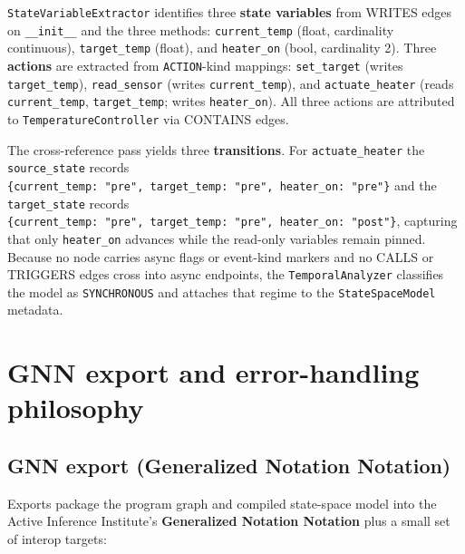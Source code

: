 \documentclass[
]{article}
\begin{document}
\texttt{StateVariableExtractor} identifies three \textbf{state
variables} from WRITES edges on \texttt{\_\_init\_\_} and the three
methods: \texttt{current\_temp} (float, cardinality continuous),
\texttt{target\_temp} (float), and \texttt{heater\_on} (bool,
cardinality 2). Three \textbf{actions} are extracted from
\texttt{ACTION}-kind mappings: \texttt{set\_target} (writes
\texttt{target\_temp}), \texttt{read\_sensor} (writes
\texttt{current\_temp}), and \texttt{actuate\_heater} (reads
\texttt{current\_temp}, \texttt{target\_temp}; writes
\texttt{heater\_on}). All three actions are attributed to
\texttt{TemperatureController} via CONTAINS edges.

The cross-reference pass yields three \textbf{transitions}. For
\texttt{actuate\_heater} the \texttt{source\_state} records
\texttt{\{current\_temp:\ "pre",\ target\_temp:\ "pre",\ heater\_on:\ "pre"\}}
and the \texttt{target\_state} records
\texttt{\{current\_temp:\ "pre",\ target\_temp:\ "pre",\ heater\_on:\ "post"\}},
capturing that only \texttt{heater\_on} advances while the read-only
variables remain pinned. Because no node carries async flags or
event-kind markers and no CALLS or TRIGGERS edges cross into async
endpoints, the \texttt{TemporalAnalyzer} classifies the model as
\texttt{SYNCHRONOUS} and attaches that regime to the
\texttt{StateSpaceModel} metadata.

\newpage

\section{GNN export and error-handling
philosophy}\label{gnn-export-and-error-handling-philosophy}

\subsection{GNN export (Generalized Notation
Notation)}\label{gnn-export-generalized-notation-notation}

Exports package the program graph and compiled state-space model into
the Active Inference Institute's \textbf{Generalized Notation Notation}
plus a small set of interop targets:
\end{document}
